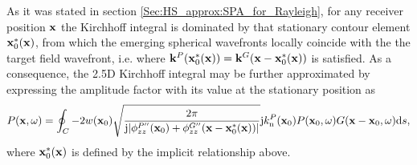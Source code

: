 \vspace{3mm}
As it was stated in section \ref{Sec:HS_approx:SPA_for_Rayleigh}, for any receiver position $\mathbf{x}$ the Kirchhoff integral is dominated by that stationary contour element $\mathbf{x}_0^*(\mathbf{x})$, from which the emerging spherical wavefronts locally coincide with the the target field wavefront, i.e. where $\mathbf{k}^P(\mathbf{x}_0^*(\mathbf{x})) = \mathbf{k}^G(\mathbf{x} - \mathbf{x}_0^*(\mathbf{x}))$ is satisfied.
As a consequence, the 2.5D Kirchhoff integral may be further approximated by expressing the amplitude factor with its value at the stationary position as
\begin{equation}
P(\mathbf{x},\omega) = 
\oint_{C}
- 2 w(\mathbf{x}_0) 
\sqrt{\frac{2 \pi}{\mathrm{j} |\phi^{P''}_{zz}(\mathbf{x}_0) +\phi^{G''}_{zz}(\mathbf{x}-\mathbf{x}_0^*(\mathbf{x}))|}}
\mathrm{j} k_{\mathrm{n}}^P(\mathbf{x}_0) 	P(\mathbf{x}_0,\omega)
G(\mathbf{x}-\mathbf{x}_0,\omega) \mathrm{d} s,
\label{Eq:SFS_theory:25D_KI_appr}
\end{equation}
where $\mathbf{x}_0^*(\mathbf{x})$ is defined by the implicit relationship above.

